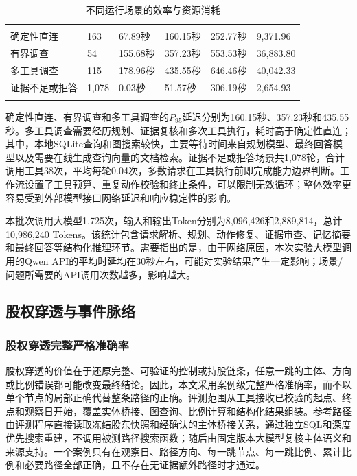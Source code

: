 \begin{table}[htbp]
  \centering
  \caption{不同运行场景的效率与资源消耗}
  \label{tab:runtime-cost}
  \footnotesize
  \setlength{\tabcolsep}{2.5pt}
  \begin{tabular}{@{}C{.24\textwidth}*{5}{C{.13\textwidth}}@{}}
    \fintracetoprule
     &  &  &  &  &  \\
    \fintracemidrule
    确定性直连 & 163 & 67.89秒 & 160.15秒 & 252.77秒 & 9,371.96 \\
    有界调查 & 54 & 155.68秒 & 357.23秒 & 553.53秒 & 36,883.80 \\
    多工具调查 & 115 & 178.96秒 & 435.55秒 & 646.46秒 & 40,042.33 \\
    证据不足或拒答 & 1,078 & 0.03秒 & 51.57秒 & 306.19秒 & 2,654.93 \\
    \fintracebottomrule
  \end{tabular}
\end{table}

确定性直连、有界调查和多工具调查的$P_{95}$延迟分别为160.15秒、357.23秒和435.55秒。多工具调查需要经历规划、证据复核和多次工具执行，耗时高于确定性直连；其中，本地SQLite查询和图搜索较快，主要等待时间来自规划模型、最终回答模型以及需要在线生成查询向量的文档检索。证据不足或拒答场景共1,078轮，合计调用工具38次，平均每轮0.04次，多数请求在工具执行前即完成能力边界判断。工作流设置了工具预算、重复动作校验和终止条件，可以限制无效循环；整体效率更容易受到外部模型接口网络延迟和响应稳定性的影响。

本批次调用大模型1,725次，输入和输出Token分别为8,096,426和2,889,814，总计10,986,240 Tokens。该统计包含请求解析、规划、动作修复、证据审查、记忆摘要和最终回答等结构化推理环节。需要指出的是，由于网络原因，本次实验大模型调用的Qwen API的平均时延均在30秒左右，可能对实验结果产生一定影响；场景/问题所需要的API调用次数越多，影响越大。

\subsection{股权穿透与事件脉络}

\subsubsection{股权穿透完整严格准确率}

股权穿透的价值在于还原完整、可验证的控制或持股链条，任意一跳的主体、方向或比例错误都可能改变最终结论。因此，本文采用案例级完整严格准确率，而不以单个节点的局部正确代替整条路径的正确。评测范围从工具接收已校验的起点、终点和观察日开始，覆盖实体桥接、图查询、比例计算和结构化结果组装。参考路径由评测程序直接读取冻结股东快照和经确认的主体桥接关系，通过独立SQL和深度优先搜索重建，不调用被测路径搜索函数；随后由固定版本大模型复核主体语义和来源支持。一个案例只有在观察日、路径方向、每一跳节点、每一跳比例、累计比例和必要路径全部正确，且不存在无证据额外路径时才通过。

